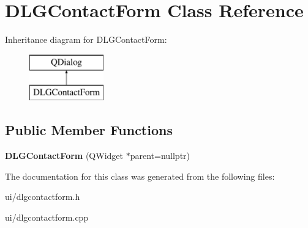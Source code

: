 \hypertarget{class_d_l_g_contact_form}{}\section{D\+L\+G\+Contact\+Form Class Reference}
\label{class_d_l_g_contact_form}
Inheritance diagram for D\+L\+G\+Contact\+Form\+:\begin{figure}[H]
\begin{center}
\leavevmode
\includegraphics[height=2.000000cm]{class_d_l_g_contact_form}
\end{center}
\end{figure}
\subsection*{Public Member Functions}
\begin{DoxyCompactItemize}
\item 
\mbox{\label{class_d_l_g_contact_form_a86b60a67ed1a97bfe07a30c6476739c4}} 
{\bfseries D\+L\+G\+Contact\+Form} (Q\+Widget $\ast$parent=nullptr)
\end{DoxyCompactItemize}


The documentation for this class was generated from the following files\+:\begin{DoxyCompactItemize}
\item 
ui/dlgcontactform.\+h\item 
ui/dlgcontactform.\+cpp\end{DoxyCompactItemize}
